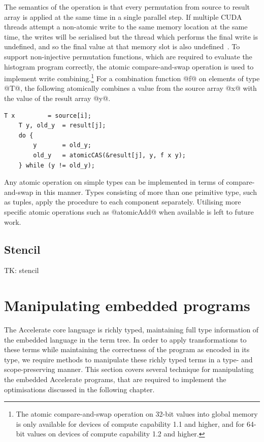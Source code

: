 The semantics of the operation is that every permutation from source to result
array is applied at the same time in a single parallel step. If multiple CUDA
threads attempt a non-atomic write to the same memory location at the same time,
the writes will be serialised but the thread which performs the final write is
undefined, and so the final value at that memory slot is also
undefined~\cite{NVIDIA:2012wf}. To support non-injective permutation functions,
which are required to evaluate the histogram program correctly, the atomic
compare-and-swap operation is used to implement write combining.\footnote{The
atomic compare-and-swap operation on 32-bit values into global memory is only
available for devices of compute capability 1.1 and higher, and for 64-bit
values on devices of compute capability 1.2 and higher.} For a combination
function @f@ on elements of type @T@, the following atomically combines a value
from the source array @x@ with the value of the result array @y@.

\begin{lstlisting}[style=cuda]
    T x         = source[i];
    T y, old_y  = result[j];
    do {
        y       = old_y;
        old_y   = atomicCAS(&result[j], y, f x y);
    } while (y != old_y);
\end{lstlisting}
%
Any atomic operation on simple types can be implemented in terms of
compare-and-swap in this manner. Types consisting of more than one primitive
type, such as tuples, apply the procedure to each component separately.
Utilising more specific atomic operations such as @atomicAdd@ when
available is left to future work.

\subsection{Stencil}

TK: stencil


\section{Manipulating embedded programs}
\label{sec:manipulating_embedded_programs}

The Accelerate core language is richly typed, maintaining full type information
of the embedded language in the term tree. In order to apply transformations to
these terms while maintaining the correctness of the program as encoded in its
type, we require methods to manipulate these richly typed terms in a type- and
scope-preserving manner. This section covers several technique for manipulating
the embedded Accelerate programs, that are required to implement the
optimisations discussed in the following chapter.


